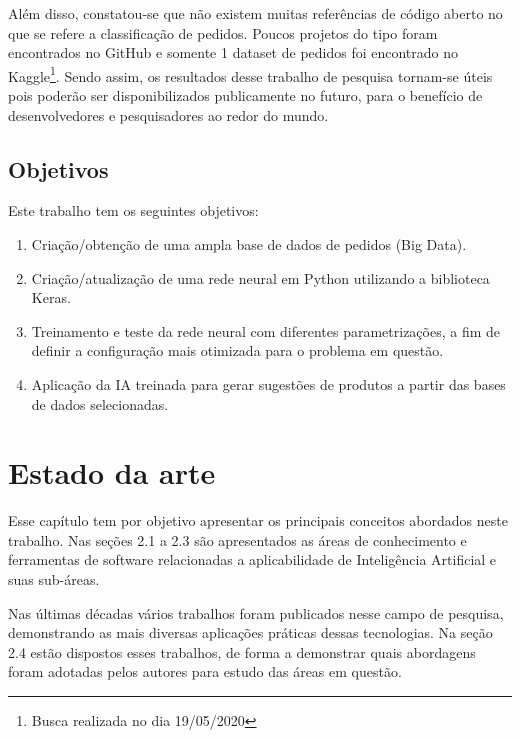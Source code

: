 Além disso, constatou-se que não existem muitas referências de código aberto no que se refere a classificação de pedidos. Poucos projetos do tipo foram encontrados no GitHub e somente 1 dataset de pedidos foi encontrado no Kaggle\footnote{Busca realizada no dia 19/05/2020}. Sendo assim, os resultados desse trabalho de pesquisa tornam-se úteis pois poderão ser disponibilizados publicamente no futuro, para o benefício de desenvolvedores e pesquisadores ao redor do mundo.

\section{Objetivos}

Este trabalho tem os seguintes objetivos:

\begin{enumerate}
\item Criação/obtenção de uma ampla base de dados de pedidos (Big Data). 
\item Criação/atualização de uma rede neural em Python utilizando a biblioteca Keras.
\item Treinamento e teste da rede neural com diferentes parametrizações, a fim de definir a configuração mais otimizada para o problema em questão.
\item Aplicação da IA treinada para gerar sugestões de produtos a partir das bases de dados selecionadas.
\end{enumerate}

\iffalse
\textcolor{red}{procure citar mais autores\\
por exemplo destes cites -- deixei comentado:
}
\fi

\chapter{Estado da arte}
\pagestyle{simple} 

Esse capítulo tem por objetivo apresentar os principais conceitos abordados neste trabalho. Nas seções 2.1 a 2.3 são apresentados as áreas de conhecimento e ferramentas de software relacionadas a aplicabilidade de Inteligência Artificial e suas sub-áreas.

Nas últimas décadas vários trabalhos foram publicados nesse campo de pesquisa, demonstrando as mais diversas aplicações práticas dessas tecnologias. Na seção 2.4 estão dispostos esses trabalhos, de forma a demonstrar quais abordagens foram adotadas pelos autores para estudo das áreas em questão.

